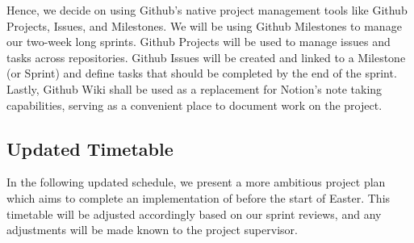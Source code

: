 Hence, we decide on using Github's native project management tools like Github Projects, Issues, and Milestones. We will be using Github Milestones to manage our two-week long sprints. Github Projects will be used to manage issues and tasks across repositories. Github Issues will be created and linked to a Milestone (or Sprint) and define tasks that should be completed by the end of the sprint. Lastly, Github Wiki shall be used as a replacement for Notion's note taking capabilities, serving as a convenient place to document work on the project.

\subsection{Updated Timetable}
\label{sec:timetablev2}

In the following updated schedule, we present a more ambitious project plan which aims to complete an implementation of \cite{SpeedStacking} before the start of Easter. This timetable will be adjusted accordingly based on our sprint reviews, and any adjustments will be made known to the project supervisor. 

